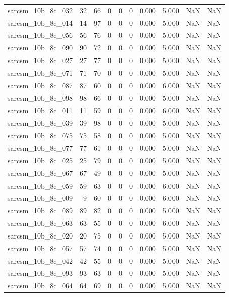 \documentclass{article}
\begin{document}
\begin{longtable}{lrrrrrrrrr}
sarcsm\_10b\_8c\_032 & 32 & 66 & 0 & 0 & 0 & 0.000 & 5.000 & NaN & NaN \\
sarcsm\_10b\_8c\_014 & 14 & 97 & 0 & 0 & 0 & 0.000 & 5.000 & NaN & NaN \\
sarcsm\_10b\_8c\_056 & 56 & 76 & 0 & 0 & 0 & 0.000 & 5.000 & NaN & NaN \\
sarcsm\_10b\_8c\_090 & 90 & 72 & 0 & 0 & 0 & 0.000 & 5.000 & NaN & NaN \\
sarcsm\_10b\_8c\_027 & 27 & 77 & 0 & 0 & 0 & 0.000 & 5.000 & NaN & NaN \\
sarcsm\_10b\_8c\_071 & 71 & 70 & 0 & 0 & 0 & 0.000 & 5.000 & NaN & NaN \\
sarcsm\_10b\_8c\_087 & 87 & 60 & 0 & 0 & 0 & 0.000 & 6.000 & NaN & NaN \\
sarcsm\_10b\_8c\_098 & 98 & 66 & 0 & 0 & 0 & 0.000 & 5.000 & NaN & NaN \\
sarcsm\_10b\_8c\_011 & 11 & 59 & 0 & 0 & 0 & 0.000 & 6.000 & NaN & NaN \\
sarcsm\_10b\_8c\_039 & 39 & 98 & 0 & 0 & 0 & 0.000 & 5.000 & NaN & NaN \\
sarcsm\_10b\_8c\_075 & 75 & 58 & 0 & 0 & 0 & 0.000 & 5.000 & NaN & NaN \\
sarcsm\_10b\_8c\_077 & 77 & 61 & 0 & 0 & 0 & 0.000 & 5.000 & NaN & NaN \\
sarcsm\_10b\_8c\_025 & 25 & 79 & 0 & 0 & 0 & 0.000 & 5.000 & NaN & NaN \\
sarcsm\_10b\_8c\_067 & 67 & 49 & 0 & 0 & 0 & 0.000 & 5.000 & NaN & NaN \\
sarcsm\_10b\_8c\_059 & 59 & 63 & 0 & 0 & 0 & 0.000 & 6.000 & NaN & NaN \\
sarcsm\_10b\_8c\_009 & 9 & 60 & 0 & 0 & 0 & 0.000 & 6.000 & NaN & NaN \\
sarcsm\_10b\_8c\_089 & 89 & 82 & 0 & 0 & 0 & 0.000 & 5.000 & NaN & NaN \\
sarcsm\_10b\_8c\_063 & 63 & 55 & 0 & 0 & 0 & 0.000 & 6.000 & NaN & NaN \\
sarcsm\_10b\_8c\_020 & 20 & 75 & 0 & 0 & 0 & 0.000 & 5.000 & NaN & NaN \\
sarcsm\_10b\_8c\_057 & 57 & 74 & 0 & 0 & 0 & 0.000 & 5.000 & NaN & NaN \\
sarcsm\_10b\_8c\_042 & 42 & 55 & 0 & 0 & 0 & 0.000 & 5.000 & NaN & NaN \\
sarcsm\_10b\_8c\_093 & 93 & 63 & 0 & 0 & 0 & 0.000 & 5.000 & NaN & NaN \\
sarcsm\_10b\_8c\_064 & 64 & 69 & 0 & 0 & 0 & 0.000 & 5.000 & NaN & NaN \\

\end{longtable}
\end{document}
